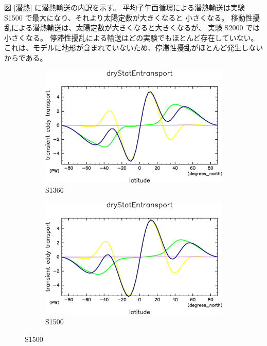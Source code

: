 \documentclass[body]{subfiles}
\begin{document}
図 \ref{潜熱} に潜熱輸送の内訳を示す。
平均子午面循環による潜熱輸送は実験 S1500 で最大になり、それより太陽定数が大きくなると
小さくなる。
移動性擾乱による潜熱輸送は、太陽定数が大きくなると大きくなるが、
実験 S2000 では小さくなる。
停滞性擾乱による輸送はどの実験でもほとんど存在していない。
これは、モデルに地形が含まれていないため、停滞性擾乱がほとんど発生しないからである。

\begin{figure}[t]
	\centering
	\begin{subfigure}{.4\textwidth}
		\centering
		\includegraphics[width=\textwidth]{S1366/MeriHeatTrans@dryStatEn,time=14600:14965-crop-rotate.pdf}
		\caption{S1366}\label{乾燥静的エネルギーS1366}
	\end{subfigure}
	\begin{subfigure}{.4\textwidth}
		\centering
		\includegraphics[width=\textwidth]{S1500/MeriHeatTrans@dryStatEn,time=3650:4015-crop-rotate.pdf}
		\caption{S1500}\label{乾燥静的エネルギーS1500}

\end{subfigure}
\end{figure}
\end{document}
